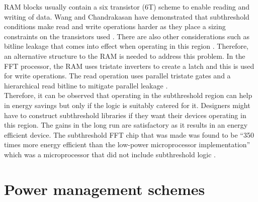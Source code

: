 \documentclass[journal]{IEEEtran}
\begin{document}
RAM blocks usually contain a six transistor (6T) scheme to enable reading and writing of data. Wang and Chandrakasan have demonstrated that subthreshold conditions make read and write operations harder as they place a sizing constraints on the transistors used \cite{FFT}. There are also other considerations such as bitline leakage that comes into effect when operating in this region \cite{FFT}. Therefore, an alternative structure to the RAM is needed to address this problem. In the FFT processor, the RAM uses tristate inverters to create a latch and this is used for write operations. The read operation uses parallel tristate gates and a hierarchical read bitline to mitigate parallel leakage \cite{FFT}. \\

Therefore, it can be observed that operating in the subthreshold region can help in energy savings but only if the logic is suitably catered for it. Designers might have to construct subthreshold libraries if they want their devices operating in this region. The gains in the long run are satisfactory as it results in an energy efficient device.  The subthreshold FFT chip that was made was found to be ``350 times more energy efficient than the low-power microprocessor implementation'' which was a microprocessor that did not include subthreshold logic \cite{FFT}.


\section{Power management schemes}
\end{document}

